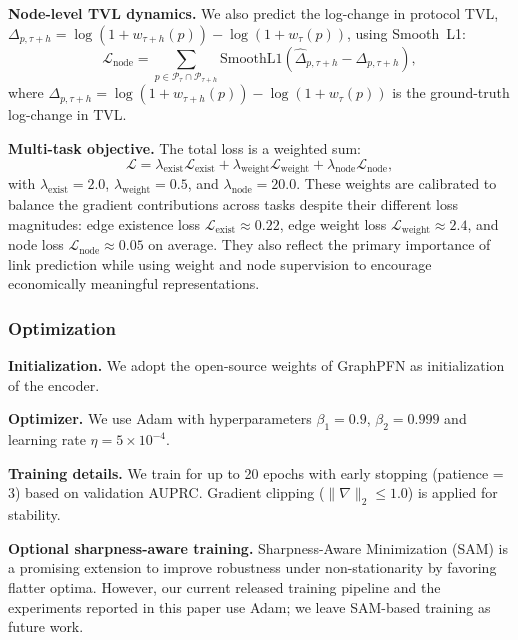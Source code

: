 \textbf{Node-level TVL dynamics.}
We also predict the log-change in protocol TVL,
$\Delta_{p,\tau+h}=\log(1+w_{\tau+h}(p))-\log(1+w_{\tau}(p))$,
using Smooth~L1:
\begin{equation}
\mathcal{L}_{\text{node}}
=
\sum_{p\in\mathcal{P}_{\tau}\cap \mathcal{P}_{\tau+h}}
\mathrm{SmoothL1}\!\left(\widehat{\Delta}_{p,\tau+h}-\Delta_{p,\tau+h}\right),
\label{eq:loss-node}
\end{equation}
where $\Delta_{p,\tau+h} = \log(1+w_{\tau+h}(p)) - \log(1+w_{\tau}(p))$ is the ground-truth log-change in TVL.


\textbf{Multi-task objective.}
The total loss is a weighted sum:
\begin{equation}
\mathcal{L}
=
\lambda_{\text{exist}}\mathcal{L}_{\text{exist}}
+
\lambda_{\text{weight}}\mathcal{L}_{\text{weight}}
+
\lambda_{\text{node}}\mathcal{L}_{\text{node}},
\label{eq:loss-total}
\end{equation}
with $\lambda_{\text{exist}}=2.0$, $\lambda_{\text{weight}}=0.5$, and $\lambda_{\text{node}}=20.0$. These weights are calibrated to balance the gradient contributions across tasks despite their different loss magnitudes: edge existence loss $\mathcal{L}_{\mathrm{exist}} \approx 0.22$, edge weight loss $\mathcal{L}_{\mathrm{weight}} \approx 2.4$, and node loss $\mathcal{L}_{\mathrm{node}} \approx 0.05$ on average. They also reflect the primary importance of link prediction while using weight and node supervision to encourage economically meaningful representations. 

\subsubsection{Optimization}\label{subsubsec:optim}

\textbf{Initialization.} We adopt the open-source weights of GraphPFN as initialization of the encoder. 

\textbf{Optimizer.}
We use Adam \citep{KingmaBa2015Adam} with hyperparameters $\beta_1=0.9$, $\beta_2=0.999$ and learning rate $\eta = 5 \times 10^{-4}$.

\textbf{Training details.}
We train for up to 20 epochs with early stopping (patience = 3) based on validation AUPRC. Gradient clipping ($\|\nabla\|_2 \le 1.0$) is applied for stability.

\textbf{Optional sharpness-aware training.}
Sharpness-Aware Minimization (SAM) is a promising extension to improve robustness under non-stationarity by favoring flatter optima. However, our current released training pipeline and the experiments reported in this paper use Adam; we leave SAM-based training as future work.

